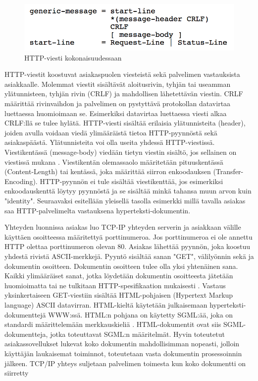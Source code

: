 \documentclass[utf8]{gradu3}
\begin{document}
\begin{figure}[h]
\centering
\includegraphics[scale=0.85]{generic_message.png}
\caption{HTTP-viesti kokonaisuudessaan \cite{httprequest}}
\end{figure}

HTTP-viestit koostuvat asiakaspuolen viesteistä sekä palvelimen vastauksista asiakkaalle. Molemmat viestit sisältävät aloitusrivin, tyhjän tai useamman ylätunnisteen, tyhjän rivin (CRLF) ja mahdollisen lähetettävän viestin. CRLF määrittää rivinvaihdon ja palvelimen on pystyttävä protokollan datavirtaa luettaessa huomioimaan se. Esimerkiksi datavirtaa luettaessa viesti alkaa CRLF:llä se tulee hylätä. HTTP-viesti sisältää erilaisia ylätunnisteita (header), joiden avulla voidaan viedä ylimääräistä tietoa HTTP-pyynnöstä sekä asiakaspäästä. Ylätunnisteita voi olla useita yhdessä HTTP-viestissä. Viestikentässä (message-body) viedään tietyn viestin sisältö, jos sellainen on viestissä mukana \cite{httprequest}. Viestikentän olemassaolo määritetään pituuskentässä (Content-Length) tai kentässä, joka määrittää siirron enkoodauksen (Transfer-Encoding). HTTP-pyynnön ei tule sisältää viestikenttää, jos esimerkiksi enkoodauskenttä löytyy pyynnöstä ja se sisältää minkä tahansa muun arvon kuin "identity".  Seuraavaksi esitellään yleisellä tasolla esimerkki millä tavalla asiakas saa HTTP-palvelimelta vastauksena hyperteksti-dokumentin.

Yhteyden luonnissa asiakas luo TCP-IP yhteyden serverin ja asiakkaan välille käyttäen osoitteessa määritettyä porttinumeroa. Jos porttinumeroa ei ole annettu HTTP olettaa porttinumeron olevan 80. Asiakas lähettää pyynnön, joka koostuu yhdestä rivistä ASCII-merkkejä. Pyyntö sisältää sanan "GET", välilyönnin sekä ja dokumentin osoitteen. Dokumentin osoitteen tulee olla yksi yhtenäinen sana. Kaikki ylimääräiset sanat, jotka löydetään dokumentin osoitteesta jätetään huomioimatta tai ne tulkitaan HTTP-spesifikaation mukaisesti \cite{w3http2}. Vastaus yksinkertaiseen GET-viestiin sisältää HTML-pohjaisen (Hypertext Markup language) ASCII datavirran. HTML-kieltä käytetään julkaisemaan hyperteksti-dokumenttejä WWW:ssä. HTML:n pohjana on käytetty SGML:ää, joka on standardi määrittelemään merkkauskieliä \cite{sgml}. HTML-dokumentit ovat siis SGML-dokumentteja, jotka toteuttavat SGML:n määritelmät.  Hyvin toteutetut asiakassovellukset lukevat koko dokumentin mahdollisimman nopeasti, jolloin käyttäjän laukaisemat toiminnot, toteutetaan vasta dokumentin prosessoinnin jälkeen. TCP/IP yhteys suljetaan palvelimen toimesta kun koko dokumentti on siirretty \cite{w3http}
\end{document}
